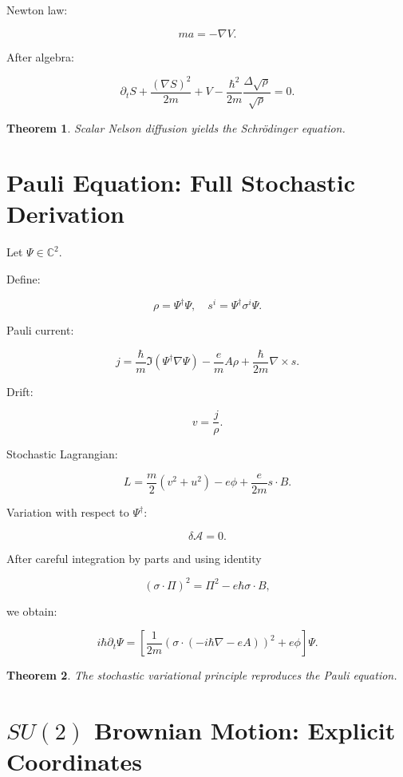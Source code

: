 \documentclass[12pt]{article}
\newtheorem{theorem}{Theorem}
\begin{document}
Newton law:

\[
ma = -\nabla V.
\]

After algebra:

\[
\partial_t S + \frac{(\nabla S)^2}{2m}
+ V
- \frac{\hbar^2}{2m}
\frac{\Delta\sqrt{\rho}}{\sqrt{\rho}}
=0.
\]

\begin{theorem}
Scalar Nelson diffusion yields the Schr\"odinger equation.
\end{theorem}

\section{Pauli Equation: Full Stochastic Derivation}

Let $\Psi\in\mathbb{C}^2$.

Define:

\[
\rho=\Psi^\dagger\Psi,
\quad
s^i=\Psi^\dagger\sigma^i\Psi.
\]

Pauli current:

\[
j=
\frac{\hbar}{m}\Im(\Psi^\dagger\nabla\Psi)
-\frac{e}{m}A\rho
+\frac{\hbar}{2m}\nabla\times s.
\]

Drift:

\[
v=\frac{j}{\rho}.
\]

Stochastic Lagrangian:

\[
L=
\frac{m}{2}(v^2+u^2)
- e\phi
+ \frac{e}{2m}s\cdot B.
\]

Variation with respect to $\Psi^\dagger$:

\[
\delta \mathcal{A}=0.
\]

After careful integration by parts and using identity

\[
(\sigma\cdot\Pi)^2
=
\Pi^2 - e\hbar\sigma\cdot B,
\]

we obtain:

\[
i\hbar\partial_t\Psi
=
\left[
\frac{1}{2m}(\sigma\cdot(-i\hbar\nabla-eA))^2
+ e\phi
\right]\Psi.
\]

\begin{theorem}
The stochastic variational principle reproduces the Pauli equation.
\end{theorem}

\section{$SU(2)$ Brownian Motion: Explicit Coordinates}
\end{document}
